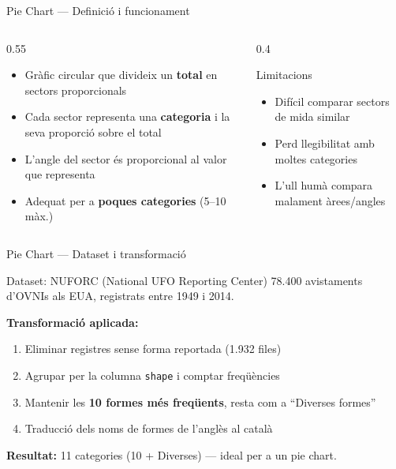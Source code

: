 \documentclass[aspectratio=169, 11pt]{beamer}
\begin{document}

\begin{frame}{Pie Chart --- Definició i funcionament}
\begin{columns}
\begin{column}{0.55\textwidth}
\begin{itemize}
    \item Gràfic circular que divideix un \textbf{total} en sectors proporcionals
    \item Cada sector representa una \textbf{categoria} i la seva proporció sobre el total
    \item L'angle del sector és proporcional al valor que representa
    \item Adequat per a \textbf{poques categories} (5--10 màx.)
\end{itemize}
\end{column}
\begin{column}{0.4\textwidth}
\begin{block}{Limitacions}
    \small
    \begin{itemize}
        \item Difícil comparar sectors de mida similar
        \item Perd llegibilitat amb moltes categories
        \item L'ull humà compara malament àrees/angles
    \end{itemize}
\end{block}
\end{column}
\end{columns}
\end{frame}

\begin{frame}{Pie Chart --- Dataset i transformació}
\begin{block}{Dataset: NUFORC (National UFO Reporting Center)}
    78.400 avistaments d'OVNIs als EUA, registrats entre 1949 i 2014.
\end{block}

\vspace{0.8em}

\textbf{Transformació aplicada:}
\begin{enumerate}
    \item Eliminar registres sense forma reportada (1.932 files)
    \item Agrupar per la columna \texttt{shape} i comptar freqüències
    \item Mantenir les \textbf{10 formes més freqüents}, resta com a ``Diverses formes''
    \item Traducció dels noms de formes de l'anglès al català
\end{enumerate}

\vspace{0.5em}
\small
\textbf{Resultat:} 11 categories (10 + Diverses) --- ideal per a un pie chart.
\end{frame}
\end{document}
